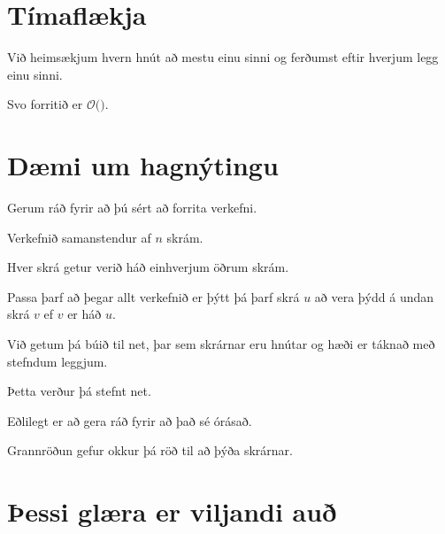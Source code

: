 \section{Tímaflækja}
{
	{
		\item<1-> Við heimsækjum hvern hnút að mestu einu sinni og ferðumst eftir hverjum legg einu sinni.
		\item<2-> Svo forritið er $\mathcal{O}($\onslide<3->{$E + V$}$)$.
	}
}

\section{Dæmi um hagnýtingu}
{
	{
		\item<1-> Gerum ráð fyrir að þú sért að forrita verkefni.
		\item<2-> Verkefnið samanstendur af $n$ skrám.
		\item<3-> Hver skrá getur verið háð einhverjum öðrum skrám.
		\item<4-> Passa þarf að þegar allt verkefnið er þýtt þá þarf skrá $u$ að vera þýdd á undan skrá $v$ ef $v$ er háð $u$.
		\item<5-> Við getum þá búið til net, þar sem skrárnar eru hnútar og hæði er táknað með stefndum leggjum.
		\item<6-> Þetta verður þá stefnt net.
		\item<7-> Eðlilegt er að gera ráð fyrir að það sé órásað.
		\item<8-> Grannröðun gefur okkur þá röð til að þýða skrárnar.
	}
}

\section{Þessi glæra er viljandi auð}
{
}



